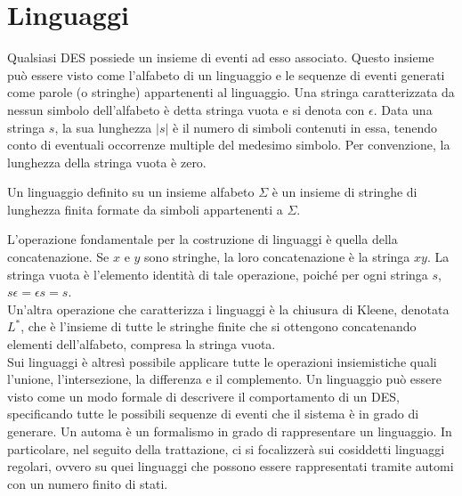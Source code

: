 \section{Linguaggi}
Qualsiasi DES possiede un insieme di eventi ad esso associato. Questo insieme può essere visto come l'alfabeto di un linguaggio e le sequenze di eventi generati come parole (o stringhe) appartenenti al linguaggio. Una stringa caratterizzata da nessun simbolo dell'alfabeto è detta stringa vuota e si denota con $\epsilon$.
Data una stringa $s$, la sua lunghezza $|s|$ è il numero di simboli contenuti in essa, tenendo conto di eventuali occorrenze multiple del medesimo simbolo. Per convenzione, la lunghezza della stringa vuota è zero.
\begin{defn}
Un linguaggio definito su un insieme alfabeto $\Sigma$ è un insieme di stringhe di lunghezza finita formate da simboli appartenenti a $\Sigma$.
\end{defn}
L'operazione fondamentale per la costruzione di linguaggi è quella della concatenazione. Se $x$ e $y$ sono stringhe, la loro concatenazione è la stringa $xy$. La stringa vuota è l'elemento identità di tale operazione, poiché per ogni stringa $s$, $s\epsilon = \epsilon s = s$.\\
Un'altra operazione che caratterizza i linguaggi è la chiusura di Kleene, denotata $L^*$, che è l'insieme di tutte le stringhe finite che si ottengono concatenando elementi dell'alfabeto, compresa la stringa vuota.\\
Sui linguaggi è altresì possibile applicare tutte le operazioni insiemistiche quali l'unione, l'intersezione, la differenza e il complemento.
Un linguaggio può essere visto come un modo formale di descrivere il comportamento di un DES, specificando tutte le possibili sequenze di eventi che il sistema è in grado di generare. 
Un automa è un formalismo in grado di rappresentare un linguaggio.
In particolare, nel seguito della trattazione, ci si focalizzerà sui cosiddetti linguaggi regolari, ovvero su quei linguaggi che possono essere rappresentati tramite automi con un numero finito di stati.

\newpage
